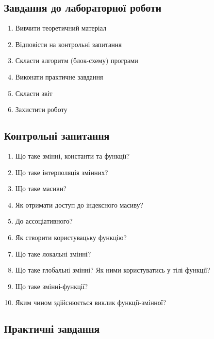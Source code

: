 \nopagebreak[4]
\subsection*{Завдання до лабораторної роботи}
\nopagebreak[4]
\begin{enumerate}
\item Вивчити теоретичний матеріал
\item Відповісти на контрольні запитання
\item Скласти алгоритм (блок-схему) програми
\item Виконати практичне завдання
\item Скласти звіт
\item Захистити роботу
\end{enumerate}

\subsection*{Контрольні запитання}
\nopagebreak[4]
\begin{enumerate}
\item Що таке змінні, константи та функції?
\item Що таке інтерполяція змінних?
\item Що таке масиви?
\item Як отримати доступ до індексного масиву? 
\item До ассоціативного?
\item Як створити користувацьку функцію?
\item Що таке локальні змінні?
\item Що таке глобальні змінні? Як ними користуватись у тілі функції?
\item Що таке змінні-функції?
\item Яким чином здійснюється виклик функції-змінної?
\end{enumerate}

\subsection*{Практичні завдання}
\nopagebreak[4]


